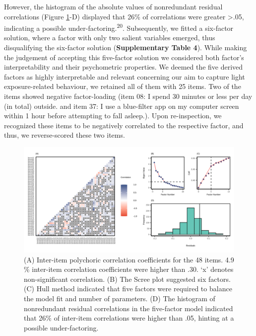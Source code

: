 \documentclass[
  man]{apa6}
\begin{document}
However, the histogram of the absolute values of nonredundant residual correlations (Figure \ref{fig:efa-plot-print}-D) displayed that 26\% of correlations were greater \textgreater\textbar.05\textbar, indicating a possible under-factoring.\textsuperscript{20}. Subsequently, we fitted a six-factor solution, where a factor with only two salient variables emerged, thus disqualifying the six-factor solution (\textbf{Supplementary Table 4}). While making the judgement of accepting this five-factor solution we considered both factor's interpretability and their psychometric properties. We deemed the five derived factors as highly interpretable and relevant concerning our aim to capture light exposure-related behaviour, we retained all of them with 25 items. Two of the items showed negative factor-loading (item 08: I spend 30 minutes or less per day (in total) outside. and item 37: I use a blue-filter app on my computer screen within 1 hour before attempting to fall asleep.). Upon re-inspection, we recognized these items to be negatively correlated to the respective factor, and thus, we reverse-scored these two items.



\begin{figure}

{\centering \includegraphics[width=1\linewidth,height=1.3\textheight]{Figures/Figure4} 

}

\caption{(A) Inter-item polychoric correlation coefficients for the 48 items. 4.9 \% inter-item correlation coefficients were higher than \textbar.30\textbar. `x' denotes non-significant correlation. (B) The Scree plot suggested six factors. (C) Hull method indicated that five factors were required to balance the model fit and number of parameters. (D) The histogram of nonredundant residual correlations in the five-factor model indicated that 26\% of inter-item correlations were higher than .05, hinting at a possible under-factoring.}\label{fig:efa-plot-print}
\end{figure}
\end{document}
